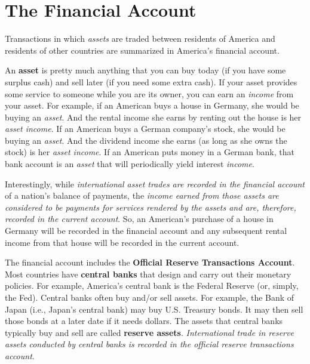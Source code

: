 \documentclass[
  letterpaper,
]{book}
\theoremstyle{plain}
\theoremstyle{remark}
\begin{document}
\section{The Financial Account}\label{sec-finacc}

Transactions in which \emph{assets} are traded between residents of
America and residents of other countries are summarized in America's
financial account.

An \textbf{asset} is pretty much anything that you can buy
today (if you have some surplus cash) and sell later (if you need some
extra cash). If your asset provides some service to someone while you
are its owner, you can earn an \emph{income} from your asset. For
example, if an American buys a house in Germany, she would be buying an
\emph{asset}. And the rental income she earns by renting out the house
is her \emph{asset income}. If an American buys a German company's
stock, she would be buying an \emph{asset}. And the dividend income she
earns (as long as she owns the stock) is her \emph{asset income}. If an
American puts money in a German bank, that bank account is an
\emph{asset} that will periodically yield interest \emph{income}.

Interestingly, while \emph{international asset trades are recorded in
the financial account} of a nation's balance of payments, the
\emph{income earned from those assets are considered to be payments for
services rendered by the assets and are, therefore, recorded in the
current account}. So, an American's purchase of a house in Germany will
be recorded in the financial account and any subsequent rental income
from that house will be recorded in the current account.

The financial account includes the \textbf{Official Reserve Transactions
Account}.
Most countries have \textbf{central banks} that
design and carry out their monetary policies. For example, America's
central bank is the Federal Reserve (or, simply, the
Fed). Central banks often buy and/or sell
assets. For example, the Bank of
Japan (i.e., Japan's central bank)
may buy U.S. Treasury bonds. It may then sell those bonds at a later
date if it needs dollars. The assets that central banks typically buy
and sell are called \textbf{reserve assets}.
\emph{International trade in reserve assets conducted by central banks
is recorded in the official reserve transactions account}.
\end{document}
